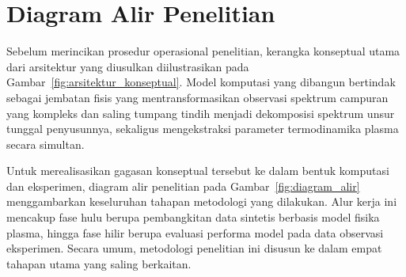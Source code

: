 

\section{Diagram Alir Penelitian}

Sebelum merincikan prosedur operasional penelitian, kerangka konseptual utama dari arsitektur yang diusulkan diilustrasikan pada Gambar~\ref{fig:arsitektur_konseptual}. Model komputasi yang dibangun bertindak sebagai jembatan fisis yang mentransformasikan observasi spektrum campuran yang kompleks dan saling tumpang tindih menjadi dekomposisi spektrum unsur tunggal penyusunnya, sekaligus mengekstraksi parameter termodinamika plasma secara simultan.

Untuk merealisasikan gagasan konseptual tersebut ke dalam bentuk komputasi dan eksperimen, diagram alir penelitian pada Gambar~\ref{fig:diagram_alir} menggambarkan keseluruhan tahapan metodologi yang dilakukan. Alur kerja ini mencakup fase hulu berupa pembangkitan data sintetis berbasis model fisika plasma, hingga fase hilir berupa evaluasi performa model pada data observasi eksperimen. Secara umum, metodologi penelitian ini disusun ke dalam empat tahapan utama yang saling berkaitan.

